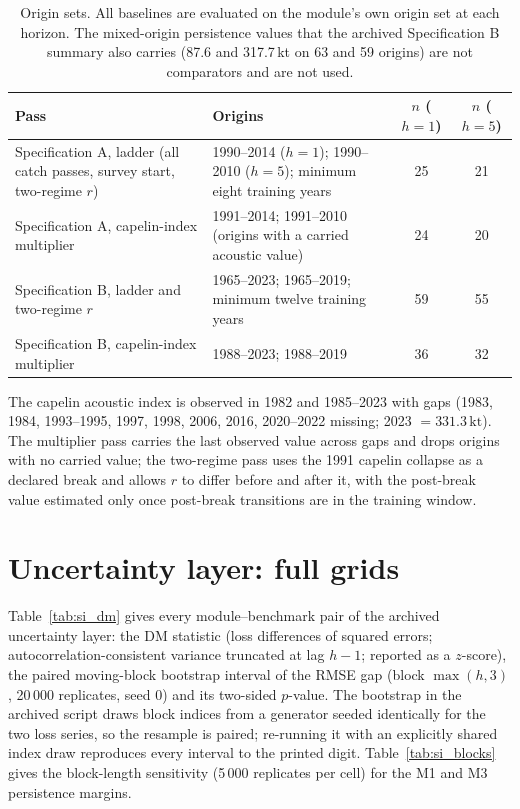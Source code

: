 \documentclass[preprint,11pt,authoryear]{elsarticle}
\theoremstyle{remark}
\newcommand{\kt}{\,\mathrm{kt}}
\begin{document}
\begin{table}[!htb]
\centering\footnotesize\setlength{\tabcolsep}{3.5pt}
\caption{Origin sets. All baselines are evaluated on the module's own origin set at each horizon. The mixed-origin persistence values that the archived Specification B summary also carries (87.6 and 317.7\,kt on 63 and 59 origins) are not comparators and are not used.}
\begin{tabularx}{\textwidth}{@{}>{\raggedright\arraybackslash}p{}Lcc@{}}
\toprule
Pass & Origins & $n$ ($h=1$) & $n$ ($h=5$) \\
\midrule
Specification A, ladder (all catch passes, survey start, two-regime $r$) & 1990--2014 ($h=1$); 1990--2010 ($h=5$); minimum eight training years & 25 & 21 \\
Specification A, capelin-index multiplier & 1991--2014; 1991--2010 (origins with a carried acoustic value) & 24 & 20 \\
Specification B, ladder and two-regime $r$ & 1965--2023; 1965--2019; minimum twelve training years & 59 & 55 \\
Specification B, capelin-index multiplier & 1988--2023; 1988--2019 & 36 & 32 \\
\bottomrule
\end{tabularx}
\end{table}

The capelin acoustic index is observed in 1982 and 1985--2023 with gaps (1983, 1984, 1993--1995, 1997, 1998, 2006, 2016, 2020--2022 missing; 2023 $= 331.3\kt$). The multiplier pass carries the last observed value across gaps and drops origins with no carried value; the two-regime pass uses the 1991 capelin collapse as a declared break and allows $r$ to differ before and after it, with the post-break value estimated only once post-break transitions are in the training window.

\FloatBarrier
\section{Uncertainty layer: full grids}\label{si:uncertainty}

Table~\ref{tab:si_dm} gives every module--benchmark pair of the archived uncertainty layer: the DM statistic (loss differences of squared errors; autocorrelation-consistent variance truncated at lag $h-1$; reported as a $z$-score), the paired moving-block bootstrap interval of the RMSE gap (block $\max(h,3)$, 20\,000 replicates, seed 0) and its two-sided $p$-value. The bootstrap in the archived script draws block indices from a generator seeded identically for the two loss series, so the resample is paired; re-running it with an explicitly shared index draw reproduces every interval to the printed digit. Table~\ref{tab:si_blocks} gives the block-length sensitivity (5\,000 replicates per cell) for the M1 and M3 persistence margins.
\end{document}
